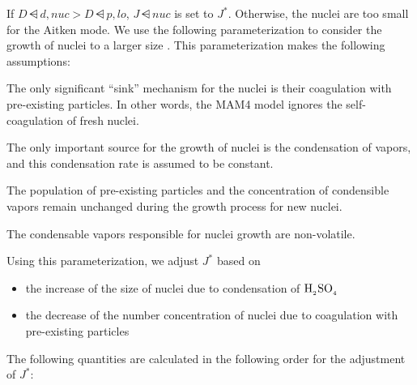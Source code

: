 If $D\dsub{d,nuc} > D\dsub{p,lo}$, $J\dsub{nuc}$ is set to $J^*$. Otherwise,
the nuclei are too small for the Aitken mode. We use the following
parameterization to consider the growth of nuclei to a larger size
\cite{kerminen-2002-jas}. This parameterization makes the following assumptions:

\begin{assume}
  The only significant ``sink'' mechanism for the nuclei is their coagulation
  with pre-existing particles. In other words, the MAM4 model ignores
  the self-coagulation of fresh nuclei.
\end{assume}

\begin{assume}
  The only important source for the growth of nuclei is the condensation
  of vapors, and this condensation rate is assumed to be constant.
\end{assume}

\begin{assume}
  The population of pre-existing particles and the concentration of
  condensible vapors remain unchanged during the growth process for new
  nuclei.
\end{assume}

\begin{assume}
  The condensable vapors responsible for nuclei growth are non-volatile.
\end{assume}

Using this parameterization, we adjust $J^*$ based on

\begin{itemize}
  \item the increase of the size of nuclei due to condensation of $\rm H_{_2}SO_{_4}$
  \item the decrease of the number concentration of nuclei due to
        coagulation with pre-existing particles
\end{itemize}

The following quantities are calculated in the following order for the
adjustment of $J^*$:


